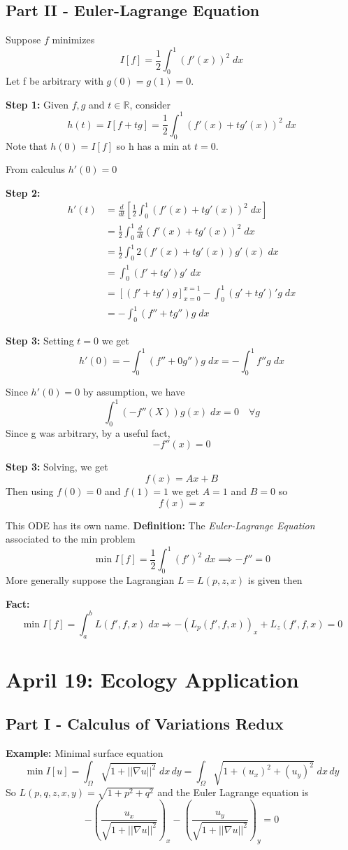 \documentclass[12pt]{article}
\begin{document}
\subsection*{Part II - Euler-Lagrange Equation}
Suppose $f$ minimizes
\[I[f] = \frac{1}{2}\int_0^1 (f'(x))^2 \; dx\]
Let f be arbitrary with $g(0) = g(1) =0$.

\textbf{Step 1:} Given $f, g$ and $t \in \mathbb{R}$, consider 
\[h(t) = I[f + tg] = \frac{1}{2}\int_0^1 (f'(x) + tg'(x))^2\; dx\]
Note that $h(0) = I[f]$ so h has a min at $t = 0$.

From calculus $h'(0) = 0$

\textbf{Step 2:}
\begin{align*}
    h'(t) &= \frac{d}{dt}\left[\frac{1}{2}\int_0^1 (f'(x) + tg'(x))^2\; dx\right]\\
    &= \frac{1}{2}\int_0^1 \frac{d}{dt}(f'(x) + tg'(x))^2\; dx\\
    &= \frac{1}{2}\int_0^1 2(f'(x) + tg'(x))g'(x)\; dx\\
    &= \int_0^1 (f' + tg')g' \; dx\\
    &= [(f' + tg')g]_{x=0}^{x=1} - \int_0^1 (g' + tg')' g\; dx\\
    &= -\int_0^1 (f'' + tg'')g\; dx
\end{align*}

\textbf{Step 3:} Setting $t= 0$ we get 
\[h'(0) = -\int_0^1 (f'' + 0g'')g\; dx = -\int_0^1 f''g\; dx\]

Since $h'(0) = 0$ by assumption, we have 
\[\int_0^1 (-f''(X))g(x)\; dx = 0 \quad \forall g\]
Since g was arbitrary, by a useful fact,
\[-f''(x) = 0\]

\textbf{Step 3:} Solving, we get 
\[f(x) = Ax + B\]
Then using $f(0) = 0$ and $f(1) = 1$ we get $A = 1$ and $B = 0$ so 
\[\boxed{f(x) = x}\]

This ODE has its own name.
\textbf{Definition:} The \emph{Euler-Lagrange Equation} associated to the min problem 
\[\min I[f] = \frac{1}{2}\int_0^1 (f')^2\; dx \implies -f'' = 0\]
More generally suppose the Lagrangian $L = L(p, z, x)$ is given then 

\textbf{Fact:}
\[\min I[f] = \int_a^b L(f', f, x)\; dx \Longrightarrow -(L_p(f', f, x))_x + L_z(f', f, x) = 0\]

\section{April 19: Ecology Application}
\subsection{Part I - Calculus of Variations Redux}
\textbf{Example:} Minimal surface equation 
\[\min I[u] = \int_{\Omega} \sqrt{1 + ||\nabla u||^2} \; dx\, dy = \int_{\Omega} \sqrt{1 + (u_x)^2  +(u_y)^2}\; dx\, dy\]
So $L(p, q, z, x, y) = \sqrt{1 + p^2 + q^2}$ and the Euler Lagrange equation is 
\[-\left(\frac{u_x}{\sqrt{1  +||\nabla u||^2}}\right)_x - \left(\frac{u_y}{\sqrt{1 + ||\nabla u||^2}}\right)_y = 0\]
\end{document}
